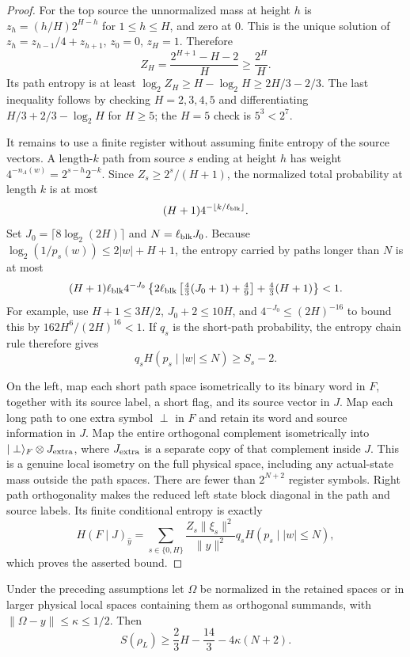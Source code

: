 \begin{proof}
For the top source the unnormalized mass at height $h$ is
$z_h=(h/H)2^{H-h}$ for $1\le h\le H$, and zero at $0$. This is the unique
solution of $z_h=z_{h-1}/4+z_{h+1}$, $z_0=0$, $z_H=1$. Therefore
\[
 Z_H=\frac{2^{H+1}-H-2}{H}\ge\frac{2^H}{H}.
\]
Its path entropy is at least $\log_2Z_H\ge H-\log_2H\ge2H/3-2/3$.
The last inequality follows by checking $H=2,3,4,5$ and differentiating
$H/3+2/3-\log_2H$ for $H\ge5$; the $H=5$ check is $5^3<2^7$.

It remains to use a finite register without assuming finite entropy of
the source vectors. A length-$k$ path from source $s$ ending at height $h$
has weight $4^{-n_A(w)}=2^{s-h}2^{-k}$. Since
$Z_s\ge2^s/(H+1)$, the normalized total probability at length $k$ is at most
\[
 (H+1)4^{-\lfloor k/\ell_{\rm blk}\rfloor}.
\]
Set $J_0=\lceil8\log_2(2H)\rceil$ and $N=\ell_{\rm blk}J_0$. Because
$\log_2(1/p_s(w))\le2|w|+H+1$, the entropy carried by paths longer than
$N$ is at most
\[
 (H+1)\ell_{\rm blk}4^{-J_0}
 \left\{2\ell_{\rm blk}\left[\tfrac43(J_0+1)+\tfrac49\right]
                  +\tfrac43(H+1)\right\}<1.
\]
For example, use $H+1\le3H/2$, $J_0+2\le10H$, and
$4^{-J_0}\le(2H)^{-16}$ to bound this by
$162H^6/(2H)^{16}<1$. If $q_s$ is the short-path probability, the entropy
chain rule therefore gives
\[
 q_s H(p_s\mid |w|\le N)\ge S_s-2.
\]

On the left, map each short path space isometrically to its binary word
in $F$, together with its source label, a short flag, and its source
vector in $J$. Map each long path to one extra symbol $\perp$ in $F$ and
retain its word and source information in $J$. Map the entire orthogonal complement isometrically into $|\perp\rangle_F\otimes J_{\rm extra}$, where $J_{\rm extra}$ is a separate copy of that complement inside $J$. This is a genuine local isometry on the full physical space, including any actual-state mass outside the path spaces. There are fewer than
$2^{N+2}$ register symbols. Right path orthogonality makes the reduced
left state block diagonal in the path and source labels. Its finite
conditional entropy is exactly
\[
 H(F\mid J)_{\widehat y}
 =\sum_{s\in\{0,H\}}\frac{Z_s\|\xi_s\|^2}{\|y\|^2}
                   q_s H(p_s\mid |w|\le N),
\]
which proves the asserted bound.
\end{proof}

\begin{lemma}\label{rnd:lem:entropy-comparison}
Under the preceding assumptions let $\Omega$ be normalized in the retained spaces or in larger physical local spaces containing them as orthogonal summands, with
$\|\Omega-y\|\le\kappa\le1/2$. Then
\[
 S(\rho_L)\ge\frac23H-\frac{14}{3}-4\kappa(N+2).
\]
\end{lemma}

